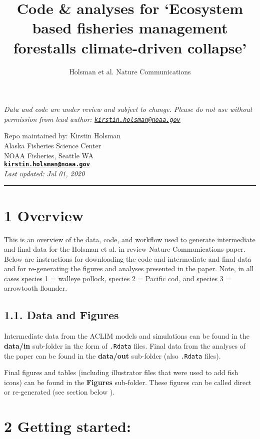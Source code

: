 \documentclass[]{article}
\title{Code \& analyses for `Ecosystem based fisheries management forestalls
climate-driven collapse'}
\author{Holsman et al. Nature Communications}
\date{}
\begin{document}
\maketitle

\emph{Data and code are under review and subject to change. Please do
not use without permission from lead author:
\href{mailto:kirstin.holsman@noaa.gov}{\nolinkurl{kirstin.holsman@noaa.gov}}}

Repo maintained by: Kirstin Holsman\\
Alaska Fisheries Science Center\\
NOAA Fisheries, Seattle WA\\
\textbf{\href{mailto:kirstin.holsman@noaa.gov}{\nolinkurl{kirstin.holsman@noaa.gov}}}\\
\emph{Last updated: Jul 01, 2020}

\begin{center}\rule{0.5\linewidth}{0.5pt}\end{center}

\section{1 Overview}\label{overview}

This is an overview of the data, code, and workflow used to generate
intermediate and final data for the Holsman et al. in review Nature
Communications paper. Below are instructions for downloading the code
and intermediate and final data and for re-generating the figures and
analyses presented in the paper. Note, in all cases species 1 = walleye
pollock, species 2 = Pacific cod, and species 3 = arrowtooth flounder.

\subsection{1.1. Data and Figures}\label{data-and-figures}

Intermediate data from the ACLIM models and simulations can be found in
the \textbf{data/in} sub-folder in the form of \texttt{.Rdata} files.
Final data from the analyses of the paper can be found in the
\textbf{data/out} sub-folder (also \texttt{.Rdata} files).

Final figures and tables (including illustrator files that were used to
add fish icons) can be found in the \textbf{Figures} sub-folder. These
figures can be called direct or re-generated (see section below ).

\section{2 Getting started:}\label{getting-started}
\end{document}
